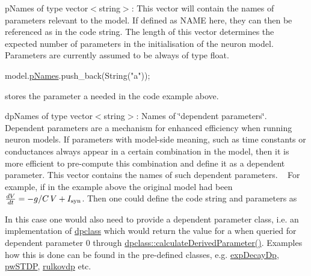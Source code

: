 \begin{DoxyItemize}
\item {\ttfamily p\+Names} of type {\ttfamily vector$<$string$>$}\+: This vector will contain the names of parameters relevant to the model. If defined as {\ttfamily N\+A\+M\+E} here, they can then be referenced as {\ttfamily } in the code string. The length of this vector determines the expected number of parameters in the initialisation of the neuron model. Parameters are currently assumed to be always of type float. ~\newline
 
\begin{DoxyCode}
model.\hyperlink{structneuronModel_a4a5bf1f757a72b6edc28ad26ed61b2be}{pNames}.push\_back(String(\textcolor{stringliteral}{"a"}));
\end{DoxyCode}
 stores the parameter {\ttfamily a} needed in the code example above.
\item {\ttfamily dp\+Names} of type {\ttfamily vector$<$string$>$}\+: Names of \char`\"{}dependent
  parameters\char`\"{}. Dependent parameters are a mechanism for enhanced efficiency when running neuron models. If parameters with model-\/side meaning, such as time constants or conductances always appear in a certain combination in the model, then it is more efficient to pre-\/compute this combination and define it as a dependent parameter. This vector contains the names of such dependent parameters. ~\newline
 For example, if in the example above the original model had been $\frac{dV}{dt} = -g/C \, V +I_{\rm syn}$. Then one could define the code string and parameters as 
 In this case one would also need to provide a dependent parameter class, i.\+e. an implementation of \hyperlink{classdpclass}{dpclass} which would return the value for {\ttfamily a} when queried for dependent parameter 0 through {\ttfamily \hyperlink{classdpclass_a4227f736c0ec826d7bda6c98e783d74a}{dpclass\+::calculate\+Derived\+Parameter()}}. Examples how this is done can be found in the pre-\/defined classes, e.\+g. \hyperlink{classexpDecayDp}{exp\+Decay\+Dp}, \hyperlink{classpwSTDP}{pw\+S\+T\+D\+P}, \hyperlink{classrulkovdp}{rulkovdp} etc.

\end{DoxyItemize}

